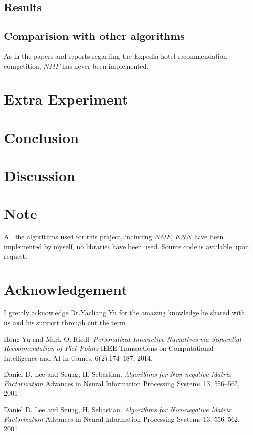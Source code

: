 \documentclass[11pt]{article} %
\begin{document}
\subsection{Results}
\subsection{Comparision with other algorithms}
As in the papers and reports regarding the Expedia hotel recommendation competition, $NMF$ has never been implemented.
\section{Extra Experiment}


\section{Conclusion}


\section{Discussion}

\section{Note}
All the algorithms used for this project, including $NMF$, $KNN$ have been implemented by myself, no libraries have been used. Source code is available upon request.
\section{Acknowledgement}
I greatly acknowledge Dr.Yaoliang Yu for the amazing knowledge he shared with us and his support through out the term.


\begin{thebibliography}{9}
Hong Yu and Mark O. Riedl.
\textit{Personalized Interactive Narratives via Sequential
Recommendation of Plot Points}
IEEE Transactions on Computational Intelligence and AI in Games, 6(2):174–187, 2014.

Daniel D. Lee and Seung, H. Sebastian.
\textit{Algorithms for Non-negative Matrix Factorization}
Advances in Neural Information Processing Systems 13, 556--562, 2001

Daniel D. Lee and Seung, H. Sebastian.
\textit{Algorithms for Non-negative Matrix Factorization}
Advances in Neural Information Processing Systems 13, 556--562, 2001

\end{thebibliography}
\end{document}
